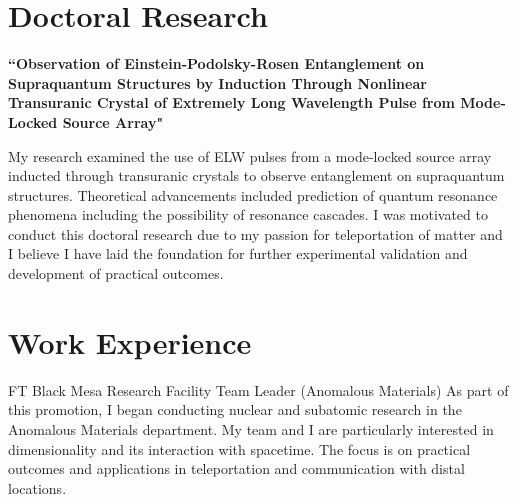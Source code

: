 \documentclass[10pt]{article} %
\begin{document}
\begin{paracol}{2} %

\section{Doctoral Research}

{\raggedright\textbf{``Observation of Einstein-Podolsky-Rosen Entanglement on Supraquantum Structures by Induction Through Nonlinear Transuranic Crystal of Extremely Long Wavelength Pulse from Mode-Locked Source Array"}\\\medskip}

My research examined the use of ELW pulses from a mode-locked source array inducted through transuranic crystals to observe entanglement on supraquantum structures. Theoretical advancements included prediction of quantum resonance phenomena including the possibility of resonance cascades. I was motivated to conduct this doctoral research due to my passion for teleportation of matter and I believe I have laid the foundation for further experimental validation and development of practical outcomes.

\medskip %


\section{Work Experience}





{FT} %
{Black Mesa Research Facility} %
{Team Leader (Anomalous Materials)} %
{As part of this promotion, I began conducting nuclear and subatomic research in the Anomalous Materials department. My team and I are particularly interested in dimensionality and its interaction with spacetime. The focus is on practical outcomes and applications in teleportation and communication with distal locations.} %


\end{paracol}
\end{document}

